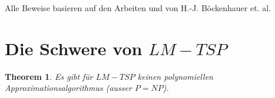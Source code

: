 \documentclass[a4paper,11pt]{scrreprt}
\begin{document}

Alle Beweise basieren auf den Arbeiten \cite{bok1} und \cite{bok2} von H.-J. Böckenhauer et. al.

\section{Die Schwere von $LM-TSP$}

\newtheorem{t1}{Theorem}

\begin{t1}
Es gibt für $LM-TSP$ keinen polynomiellen Approximationsalgorithmus (ausser $P = NP$).
\end{t1}
\end{document}
